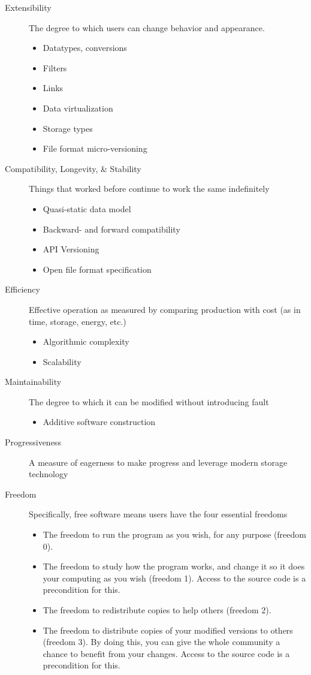 \begin{description}
    \item[Extensibility] The degree to which users can change behavior and appearance.
    \begin{itemize}
        \item Datatypes, conversions
        \item Filters
        \item Links
        \item Data virtualization
        \item Storage types
        \item File format micro-versioning
    \end{itemize}
    \item[Compatibility, Longevity, \& Stability] Things that worked before continue to work the same indefinitely
    \begin{itemize}
        \item Quasi-static data model
        \item Backward- and forward compatibility
        \item API Versioning
        \item Open file format specification
    \end{itemize}
    \item[Efficiency] Effective operation as measured by comparing production with cost (as in time, storage, energy, etc.)
    \begin{itemize}
        \item Algorithmic complexity
        \item Scalability
    \end{itemize}
    \item[Maintainability] The degree to which it can be modified without introducing fault
    \begin{itemize}
        \item Additive software construction~\cite{hanson2021}
    \end{itemize}
    \item[Progressiveness] A measure of eagerness to make progress and leverage modern storage technology
    \item[Freedom] Specifically, free software means users have the four essential freedoms~\cite{fsf2023}
    \begin{itemize}
        \item The freedom to run the program as you wish, for any purpose (freedom 0).
        \item The freedom to study how the program works, and change it so it does your computing as you wish (freedom 1). Access to the source code is a precondition for this.
        \item The freedom to redistribute copies to help others (freedom 2).
        \item The freedom to distribute copies of your modified versions to others (freedom 3). By doing this, you can give the whole community a chance to benefit from your changes. Access to the source code is a precondition for this.
    \end{itemize}
\end{description}

